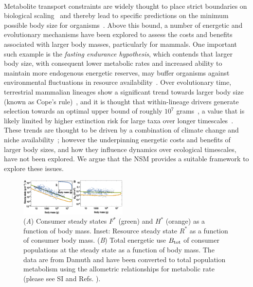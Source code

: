 \documentclass{pnastwo}
\begin{document}
\begin{article}
 \\
Metabolite transport constraints are widely thought to place strict boundaries on biological scaling~\cite{Brown:1993p708,West:1997cg,Brown:2004wq} and thereby lead to specific predictions on the minimum possible body size for organisms~\cite{West:2002ud}.
Above this bound, a number of energetic and evolutionary mechanisms have been explored to assess the costs and benefits associated with larger body masses, particularly for mammals.
One important such example is the \emph{fasting endurance hypothesis}, which contends that larger body size, with consequent lower metabolic rates and increased ability to maintain more endogenous energetic reserves, may buffer organisms against environmental fluctuations in resource availability~\cite{Millar:1990p923}.
Over evolutionary time, terrestrial mammalian lineages show a significant trend towards larger body size (known as Cope's rule)~\cite{Alroy:1998p1594,Clauset:2009fh,Smith:2010p3442,Saarinen:2014br}, and it is thought that within-lineage drivers generate selection towards an optimal upper bound of roughly $10^7$ grams~\cite{Alroy:1998p1594}, a value that is likely limited by higher extinction risk for large taxa over longer timescales~\cite{Clauset:2009fh}.
These trends are thought to be driven by a combination of climate change and niche availability~\cite{Saarinen:2014br}; however the underpinning energetic costs and benefits of larger body sizes, and how they influence dynamics over ecological timescales, have not been explored.
We argue that the NSM provides a suitable framework to explore these issues.



\begin{figure}
\centering
\includegraphics[width=0.48\textwidth]{fig_FPAllometric2.eps}
\caption{\small{ (\emph{A}) Consumer steady states $F^*$ (green) and $H^*$ (orange) as a function of
  body mass. Inset: Resource steady state $R^*$ as a function of consumer body mass.
  (\emph{B}) Total energetic use $B_{\rm tot}$ of consumer populations at the steady state as a function of body mass.
  The data are from Damuth \cite{Damuth:1987kr} and have been converted to total population metabolism using the allometric relationships for metabolic rate (please see SI and Refs. \cite{West:2001bv,hou,moses2008rmo}).}\label{fig:mass}}
\end{figure}


\end{article}
\end{document}
